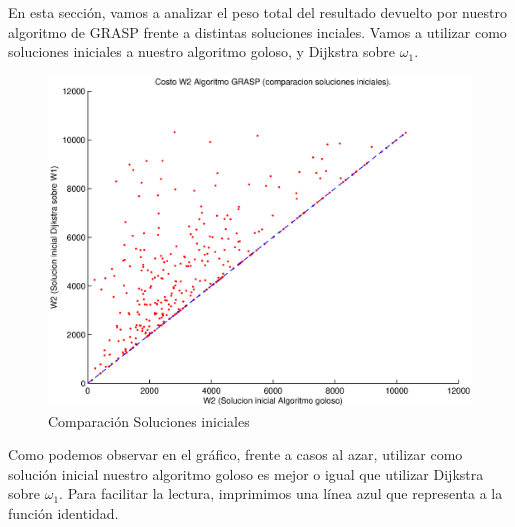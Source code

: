 En esta sección, vamos a analizar el peso total del resultado devuelto por nuestro algoritmo de GRASP frente a distintas soluciones inciales. Vamos a utilizar como soluciones iniciales a nuestro algoritmo goloso, y Dijkstra sobre $\omega_1$.

\begin{figure}[H]
  \begin{center}
    \begin{minipage}{0.5\linewidth}
      \includegraphics[width=\linewidth]{graficos/grasp_comparacion_soluciones_iniciales.eps}
      \caption{Comparación Soluciones iniciales}\label{fig:grasp-proporcion}
    \end{minipage}
  \end{center}
\end{figure}

Como podemos observar en el gráfico, frente a casos al azar, utilizar como solución inicial nuestro algoritmo goloso es mejor o igual que utilizar Dijkstra sobre $\omega_1$. Para facilitar la lectura, imprimimos una línea azul que representa a la función identidad.